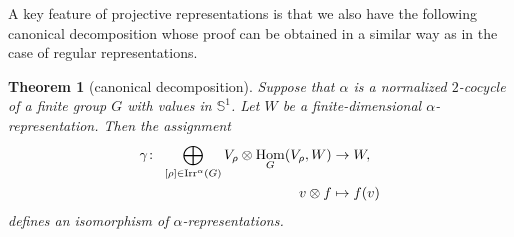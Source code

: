 \documentclass[11pt]{article}
\numberwithin{equation}{section}
\def\S{\mathbb{S}}
\DeclareMathOperator{\Hom}{\textup{Hom}}
\DeclareMathOperator{\Irr}{\textup{Irr}}
\newtheorem{Th}{Theorem}[section]
\theoremstyle{definition}
\numberwithin{equation}{section}
\begin{document}
\setcounter{Th}{4}
A key feature of projective representations is that we also have the following canonical
decomposition whose proof can be obtained in a similar way as in the case of regular
representations.

\begin{Th}[canonical decomposition]\label{can,decom}
Suppose that $\alpha$ is a
normalized $2$-cocycle of a finite group $G$ with values in $\S^{1}$. Let $W$ be a
finite-dimensional $\alpha$-representation. Then the assignment
\begin{align*}
\gamma\colon\ \bigoplus_{[\rho]\in \Irr^{\alpha}(G)}V_{\rho}\otimes \Hom_{G}(V_{\rho},W)
&\rightarrow W,
\\
v\otimes f&\mapsto f(v)
\end{align*}
defines an isomorphism of $\alpha$-representations.
\end{Th}
\end{document}
